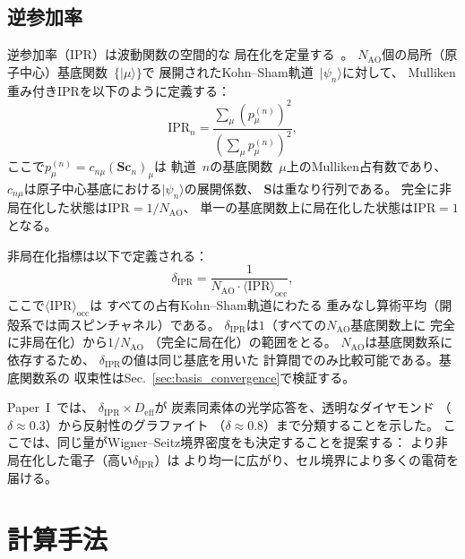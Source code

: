 \documentclass[twocolumn,showpacs,preprintnumbers,amsmath,amssymb,prb]{revtex4-2}
\begin{document}
\subsection{逆参加率}

逆参加率（IPR）は波動関数の空間的な
局在化を定量する~\cite{Bell1970,Wegner1980}。
$N_\mathrm{AO}$個の局所（原子中心）基底関数~$\{|\mu\rangle\}$で
展開されたKohn--Sham軌道~$|\psi_n\rangle$に対して、
Mulliken重み付きIPRを以下のように定義する：
\begin{equation}
  \mathrm{IPR}_n = \frac{\sum_\mu (p_\mu^{(n)})^2}
                        {\left(\sum_\mu p_\mu^{(n)}\right)^2},
  \label{eq:ipr_def}
\end{equation}
ここで$p_\mu^{(n)} = c_{n\mu} (\mathbf{S} \mathbf{c}_n)_\mu$は
軌道~$n$の基底関数~$\mu$上のMulliken占有数であり、
$c_{n\mu}$は原子中心基底における$|\psi_n\rangle$の展開係数、
$\mathbf{S}$は重なり行列である。
完全に非局在化した状態は$\mathrm{IPR} = 1/N_\mathrm{AO}$、
単一の基底関数上に局在化した状態は$\mathrm{IPR} = 1$となる。

非局在化指標は以下で定義される：
\begin{equation}
  \delta_\mathrm{IPR} = \frac{1}{N_\mathrm{AO} \cdot
    \langle \mathrm{IPR} \rangle_\mathrm{occ}},
  \label{eq:delta_ipr}
\end{equation}
ここで$\langle \mathrm{IPR} \rangle_\mathrm{occ}$は
すべての占有Kohn--Sham軌道にわたる
重みなし算術平均（開殻系では両スピンチャネル）である。
$\delta_\mathrm{IPR}$は$1$（すべての$N_\mathrm{AO}$基底関数上に
完全に非局在化）から$1/N_\mathrm{AO}$
（完全に局在化）の範囲をとる。
$N_\mathrm{AO}$は基底関数系に依存するため、
$\delta_\mathrm{IPR}$の値は同じ基底を用いた
計算間でのみ比較可能である。基底関数系の
収束性はSec.~\ref{sec:basis_convergence}で検証する。

Paper~I~\cite{SentoOpticsPaper1}では、
$\delta_\mathrm{IPR} \times D_\mathrm{eff}$が
炭素同素体の光学応答を、透明なダイヤモンド
（$\delta \approx 0.3$）から反射性のグラファイト
（$\delta \approx 0.8$）まで分類することを示した。
ここでは、同じ量がWigner--Seitz境界密度をも決定することを提案する：
より非局在化した電子（高い$\delta_\mathrm{IPR}$）は
より均一に広がり、セル境界により多くの電荷を届ける。


\section{計算手法}
\label{sec:methods}
\end{document}
